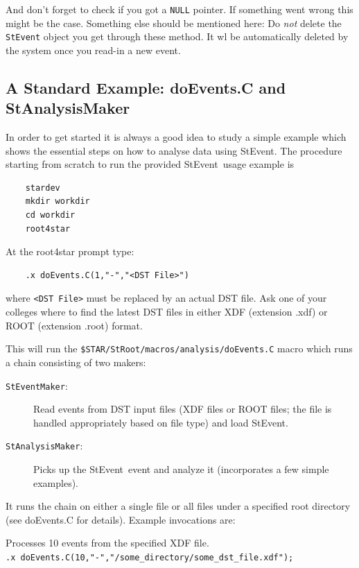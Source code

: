 \documentclass[twoside]{article}
\newcommand{\StEvent}{\textsf{StEvent}}
\begin{document}
And don't forget to check if you got a \texttt{NULL} pointer. If
something went wrong this might be the case. Something else should be
mentioned here: Do \emph{not} delete the \texttt{StEvent} object you
get through these method.  It wl be
automatically deleted by the system once you read-in a new event.
\vfill

\subsection{A Standard Example: doEvents.C and StAnalysisMaker}
\label{sec:doEvents}
  
  

In order to get started it is always a good idea to study a simple
example which shows the essential steps on how to analyse data using
\StEvent.  The procedure starting from scratch to run the provided
\StEvent\ usage example is
\begin{verbatim}
    stardev
    mkdir workdir
    cd workdir
    root4star
\end{verbatim}
At the root4star prompt type:
\begin{verbatim}
    .x doEvents.C(1,"-","<DST File>")
\end{verbatim}
where \texttt{<DST File>} must be replaced by an actual DST file. Ask
one of your colleges where to find the latest DST files in either XDF
(extension .xdf) or ROOT (extension .root) format.

This will run the \texttt{\$STAR/StRoot/macros/analysis/doEvents.C}
macro which runs a chain consisting of two makers:
\begin{description}
\item[\texttt{StEventMaker}:] Read events from DST input files (XDF
    files or ROOT files; the file is handled appropriately based on
    file type) and load \StEvent.
\item[\texttt{StAnalysisMaker}:] Picks up the \StEvent\ event and
    analyze it (incorporates a few simple examples).
\end{description}
It runs the chain on either a single file or all files under a
specified root directory (see doEvents.C for details). Example
invocations are:

Processes 10 events from the specified XDF file.\\
\hspace{1cm}\verb+.x doEvents.C(10,"-","/some_directory/some_dst_file.xdf");+\\
\end{document}
